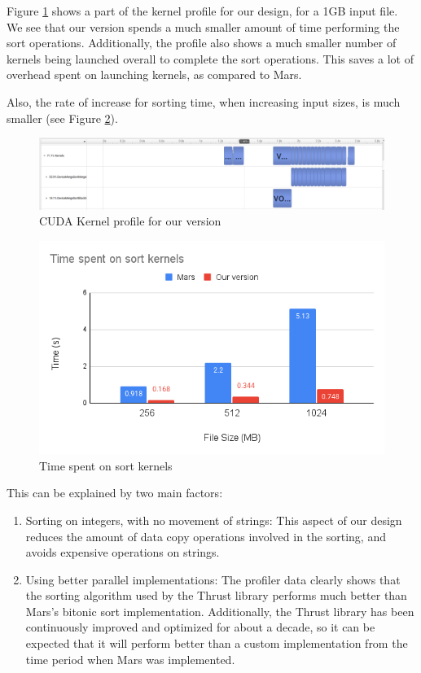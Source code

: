 \documentclass{article}
\begin{document}
Figure \ref{fig:mr-our-kernels} shows a part of the kernel profile for our design, for a 1GB input file. We see that our version spends a much smaller amount of time performing the sort operations. Additionally, the profile also shows a much smaller number of kernels being launched overall to complete the sort operations. This saves a lot of overhead spent on launching kernels, as compared to Mars.

Also, the rate of increase for sorting time, when increasing input sizes, is much smaller (see Figure \ref{fig:mr-kernels-runtimes}).

\begin{figure}[h]
    \centering
    \includegraphics[width=1\linewidth]{images/mr-our-kernels.png}
    \caption{CUDA Kernel profile for our version}
    \label{fig:mr-our-kernels}
\end{figure}

\begin{figure}[h]
    \centering
    \includegraphics[width=1\linewidth]{images/mr-kernels-time.png}
    \caption{Time spent on sort kernels}
    \label{fig:mr-kernels-runtimes}
\end{figure}

This can be explained by two main factors:
\begin{enumerate}
    \item Sorting on integers, with no movement of strings: This aspect of our design reduces the amount of data copy operations involved in the sorting, and avoids expensive operations on strings.
    \item Using better parallel implementations: The profiler data clearly shows that the sorting algorithm used by the Thrust library performs much better than Mars's bitonic sort implementation. Additionally, the Thrust library has been continuously improved and optimized for about a decade, so it can be expected that it will perform better than a custom implementation from the time period when Mars was implemented.
\end{enumerate}
\end{document}
